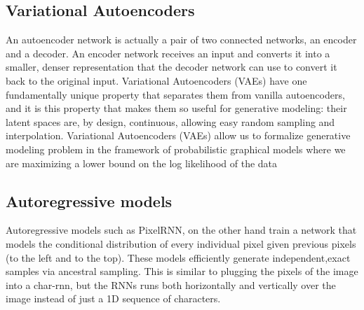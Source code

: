   \subsection{Variational Autoencoders } 
  \label{sub:vae}
  An autoencoder network is actually a pair of two connected networks, an encoder and a decoder. An encoder network receives an input and converts it into a smaller, denser representation that the decoder network can use to convert it back to the original input. Variational Autoencoders (VAEs) have one fundamentally unique property that separates them from vanilla autoencoders, and it is this property that makes them so useful for generative modeling: their latent spaces are, by design, continuous, allowing easy random sampling and interpolation. Variational Autoencoders (VAEs) allow us to formalize generative modeling problem in the framework of probabilistic graphical models where we are maximizing a lower bound on the log likelihood of the data
  \subsection{Autoregressive models} 
  \label{sub:autoregressive} 
  Autoregressive models such as PixelRNN, on the other hand train a network that models the conditional distribution of every individual pixel given previous pixels (to the left and to the top). These models efficiently generate independent,exact samples via ancestral sampling. This is similar to plugging the pixels of the image into a char-rnn, but the RNNs runs both horizontally and vertically over the image instead of just a 1D sequence of characters.\par\bigskip

